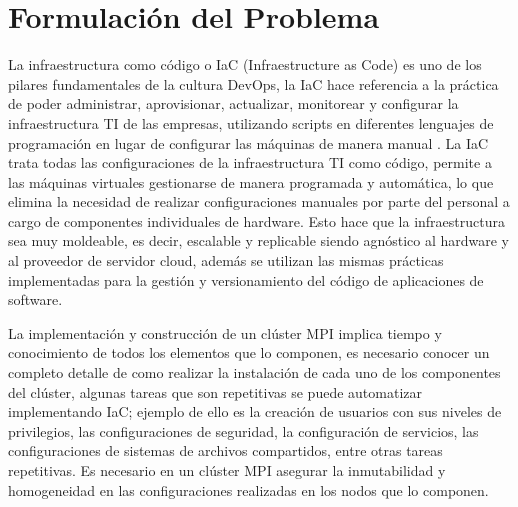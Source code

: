 \documentclass[letterpaper, 12pt, oneside]{article}
\begin{document}
    \section{Formulación del Problema}
    
    La infraestructura como código o IaC (Infraestructure as Code) es uno de los pilares fundamentales de la cultura DevOps, la IaC hace referencia a la práctica de poder administrar, aprovisionar, actualizar, monitorear y configurar la infraestructura TI de las empresas, utilizando scripts en diferentes lenguajes de programación en lugar de configurar las máquinas de manera manual\cite{devopsH4} \cite{iac}. La IaC trata todas las configuraciones de la infraestructura TI como código, permite a las máquinas virtuales gestionarse de manera programada y automática, lo que elimina la necesidad de realizar configuraciones manuales por parte del personal a cargo de componentes individuales de hardware. Esto hace que la infraestructura sea muy moldeable, es decir, escalable y replicable siendo agnóstico al hardware y al proveedor de servidor cloud, además se utilizan las mismas prácticas implementadas para la gestión y versionamiento del código de aplicaciones de software. 

    La implementación y construcción de un clúster MPI implica  tiempo y conocimiento de todos los elementos que lo componen, es necesario conocer un completo detalle de como realizar la instalación de cada uno de los componentes del clúster, algunas tareas que son repetitivas se puede automatizar implementando IaC; ejemplo de ello es la creación de usuarios con sus niveles de privilegios, las configuraciones de seguridad, la configuración de servicios, las configuraciones de sistemas de archivos compartidos, entre otras tareas repetitivas. Es necesario en un clúster MPI asegurar la inmutabilidad y homogeneidad en las configuraciones realizadas en los nodos que lo componen.\cite{repositoriounal}
    \clearpage
    
\end{document}
